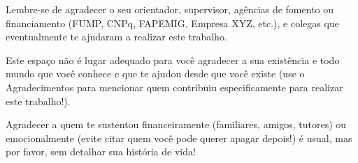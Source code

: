 

Lembre-se de agradecer o seu orientador, supervisor, agências de fomento ou financiamento (FUMP, CNPq, FAPEMIG, Empresa XYZ, etc.), e colegas que eventualmente te ajudaram a realizar este trabalho. 

Este espaço não é lugar adequado para você agradecer  a sua existência e todo mundo que você conhece e que  te ajudou desde que você existe (use o Agradecimentos para mencionar quem  contribuiu especificamente para realizar este trabalho!).

Agradecer a quem te sustentou financeiramente (familiares, amigos, tutores) ou emocionalmente (evite citar quem você pode querer apagar depois!) é usual, mas por favor, sem detalhar sua história de vida!